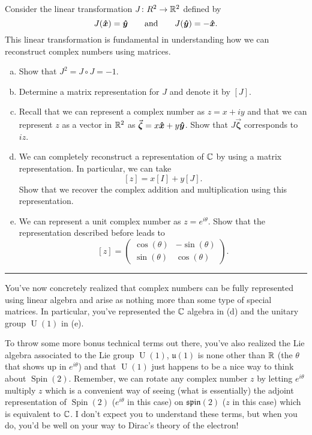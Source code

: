 \documentclass[12pt]{article} %
\begin{document}
\begin{problem}
Consider the linear transformation $J \colon R^2 \to \mathbb{R}^2$ defined by 
\[
J(\boldsymbol{\hat{x}}) = \boldsymbol{\hat{y}} \qquad \textrm{and} \qquad J(\boldsymbol{\hat{y}}) = -\boldsymbol{\hat{x}}.
\]
This linear transformation is fundamental in understanding how we can reconstruct complex numbers using matrices.
\begin{enumerate}[(a)]
    \item Show that $J^2 = J\circ J= -1$.
    \item Determine a matrix representation for $J$ and denote it by $[J]$.
    \item Recall that we can represent a complex number as $z=x + iy$ and that we can represent $z$ as a vector in $\mathbb{R}^2$ as $\vec{\boldsymbol{\zeta}} = x\boldsymbol{\hat{x}} + y\boldsymbol{\hat{y}}$.  Show that $J \vec{\boldsymbol{\zeta}}$ corresponds to $iz$.
    \item We can completely reconstruct a representation of $\mathbb{C}$ by using a matrix representation.  In particular, we can take
    \[
        [z] = x [I] + y [J].
    \]
    Show that we recover the complex addition and multiplication using this representation.
    \item We can represent a unit complex number as $z=e^{i\theta}$.  Show that the representation described before leads to
    \[
        [z] = \begin{pmatrix} \cos(\theta) & -\sin(\theta) \\ \sin(\theta) & \cos(\theta) \end{pmatrix}.
    \]
\end{enumerate}
\hrule
\vspace*{5pt}
You've now concretely realized that complex numbers can be fully represented using linear algebra and arise as nothing more than some type of special matrices.  In particular, you've represented the $\mathbb{C}$ algebra in (d) and the unitary group $\operatorname{U}(1)$ in (e).  

To throw some more bonus technical terms out there, you've also realized the Lie algebra associated to the Lie group $\operatorname{U}(1)$, $\mathfrak{u}(1)$ is none other than $\mathbb{R}$ (the $\theta$ that shows up in $e^{i\theta}$) and that $\operatorname{U}(1)$ just happens to be a nice way to think about $\operatorname{Spin}(2)$.  Remember, we can rotate any complex number $z$ by letting $e^{i \theta}$ multiply $z$ which is a convenient way of seeing (what is essentially) the adjoint representation of $\operatorname{Spin}(2)$ ($e^{i\theta}$ in this case) on $\mathfrak{spin}(2)$ ($z$ in this case) which is equivalent to $\mathbb{C}$. I don't expect you to understand these terms, but when you do, you'd be well on your way to Dirac's theory of the electron!


\end{problem}
\end{document}
